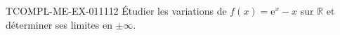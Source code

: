 \begin{exercice}{TCOMPL-ME-EX-011}{1}{12}
Étudier les variations de $f(x) = \mathrm{e}^x - x$ sur $\mathbb{R}$ et déterminer ses limites en $\pm\infty$.

\end{exercice}
